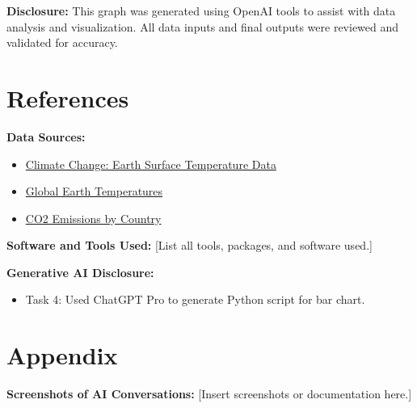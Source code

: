 \documentclass[a4paper,landscape]{article}
\begin{document}
\textbf{Disclosure:} This graph was generated using OpenAI tools to assist with data analysis and visualization. All data inputs and final outputs were reviewed and validated for accuracy.

\section{References}
\textbf{Data Sources:}
\begin{itemize}
    \item \href{https://www.kaggle.com/datasets/berkeleyearth/climate-change-earth-surface-temperature-data}{Climate Change: Earth Surface Temperature Data }
    \item \href{https://www.kaggle.com/datasets/joebeachcapital/global-earth-temperatures/code}{Global Earth Temperatures}
    \item \href{https://www.kaggle.com/datasets/ulrikthygepedersen/co2-emissions-by-country}{CO2 Emissions by Country}
\end{itemize}

\textbf{Software and Tools Used:}
[List all tools, packages, and software used.]

\textbf{Generative AI Disclosure:}
\begin{itemize}
    \item Task 4: Used ChatGPT Pro to generate Python script for bar chart.
\end{itemize}

\section{Appendix}
\textbf{Screenshots of AI Conversations:}
[Insert screenshots or documentation here.]
\end{document}
